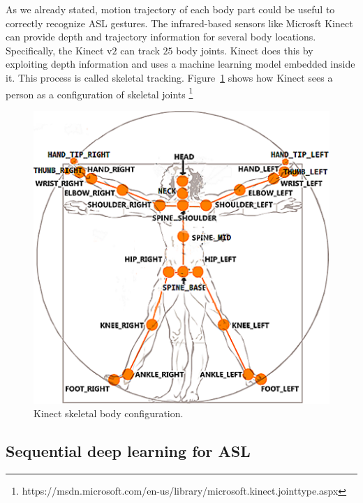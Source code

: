 \documentclass[10pt,twocolumn,letterpaper]{article}
\begin{document}
As we already stated, motion trajectory of each body part could be useful to correctly recognize ASL gestures. The infrared-based sensors like 
Microsft Kinect can provide depth and trajectory information 
for several body locations. 
Specifically, the Kinect v$2$ can 
track $25$ body joints. Kinect does this by exploiting 
depth information and uses 
a machine learning model embedded inside it. 
%
This process is called skeletal tracking. Figure~\ref{fig:kinect_sk} shows
how Kinect sees a person as a configuration of skeletal 
joints \footnote{https://msdn.microsoft.com/en-us/library/microsoft.kinect.jointtype.aspx} 
\begin{figure}[h]
	\begin{center}
		\includegraphics[width=.8\linewidth]{kinect_sk}
	\end{center}
	\caption{Kinect skeletal body configuration.}
	\label{fig:kinect_sk}
\end{figure}



\subsection{Sequential deep learning for ASL}
\end{document}
